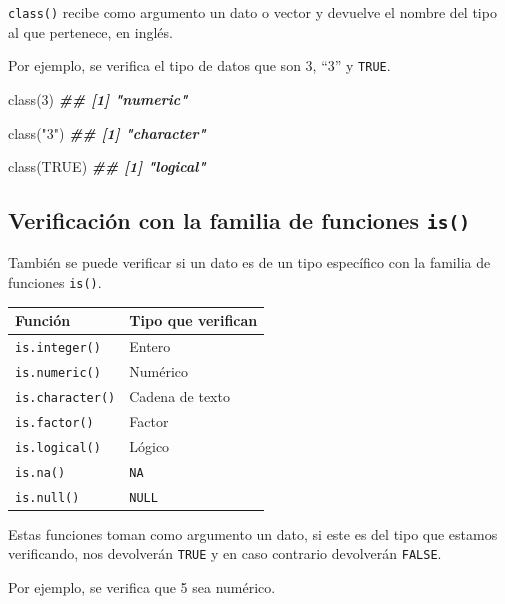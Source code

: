 \documentclass[
]{book}
\newenvironment{Shaded}{\begin{snugshade}}{\end{snugshade}}
\newcommand{\ConstantTok}[1]{\textcolor[rgb]{0.00,0.00,0.00}{#1}}
\newcommand{\DecValTok}[1]{\textcolor[rgb]{0.00,0.00,0.81}{#1}}
\newcommand{\DocumentationTok}[1]{\textcolor[rgb]{0.56,0.35,0.01}{\textbf{\textit{#1}}}}
\newcommand{\FunctionTok}[1]{\textcolor[rgb]{0.00,0.00,0.00}{#1}}
\newcommand{\NormalTok}[1]{#1}
\newcommand{\StringTok}[1]{\textcolor[rgb]{0.31,0.60,0.02}{#1}}
\begin{document}
\texttt{class()} recibe como argumento un dato o vector y devuelve el nombre del tipo al que pertenece, en inglés.

Por ejemplo, se verifica el tipo de datos que son 3, ``3'' y \texttt{TRUE}.

\begin{Shaded}
\begin{Highlighting}[]
\FunctionTok{class}\NormalTok{(}\DecValTok{3}\NormalTok{)}
\DocumentationTok{\#\# [1] "numeric"}

\FunctionTok{class}\NormalTok{(}\StringTok{"3"}\NormalTok{)}
\DocumentationTok{\#\# [1] "character"}

\FunctionTok{class}\NormalTok{(}\ConstantTok{TRUE}\NormalTok{)}
\DocumentationTok{\#\# [1] "logical"}
\end{Highlighting}
\end{Shaded}

\hypertarget{verificaciuxf3n-con-la-familia-de-funciones-is}{%
\subsection{\texorpdfstring{Verificación con la familia de funciones \texttt{is()}}{Verificación con la familia de funciones is()}}\label{verificaciuxf3n-con-la-familia-de-funciones-is}}

También se puede verificar si un dato es de un tipo específico con la familia de funciones \texttt{is()}.

\begin{longtable}[]{@{}ll@{}}
\toprule()
Función & Tipo que verifican \\
\midrule()
\endhead
\texttt{is.integer()} & Entero \\
\texttt{is.numeric()} & Numérico \\
\texttt{is.character()} & Cadena de texto \\
\texttt{is.factor()} & Factor \\
\texttt{is.logical()} & Lógico \\
\texttt{is.na()} & \texttt{NA} \\
\texttt{is.null()} & \texttt{NULL} \\
\bottomrule()
\end{longtable}

Estas funciones toman como argumento un dato, si este es del tipo que estamos verificando, nos devolverán \texttt{TRUE} y en caso contrario devolverán \texttt{FALSE}.

Por ejemplo, se verifica que 5 sea numérico.
\end{document}
